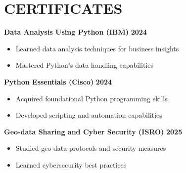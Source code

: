 \documentclass[11pt, a4paper]{article}
\begin{document}
{\centering\section*{CERTIFICATES}\par}
\textbf{Data Analysis Using Python (IBM)} \hfill \textbf{2024}
\begin{itemize}[noitemsep,topsep=0pt]
    \item Learned data analysis techniques for business insights
    \item Mastered Python's data handling capabilities
\end{itemize}

\textbf{Python Essentials (Cisco)} \hfill \textbf{2024}
\begin{itemize}[noitemsep,topsep=0pt]
    \item Acquired foundational Python programming skills
    \item Developed scripting and automation capabilities
\end{itemize}

\textbf{Geo-data Sharing and Cyber Security (ISRO)} \hfill \textbf{2025}
\begin{itemize}[noitemsep,topsep=0pt]
    \item Studied geo-data protocols and security measures
    \item Learned cybersecurity best practices
\end{itemize}
\end{document}
